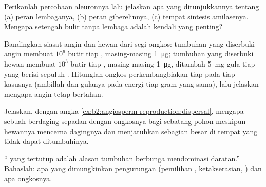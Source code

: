 \begin{exercise}[$\star\star$]\label{exo:b2:angiosperm-reproduction:9}
Perikanlah percobaan aleuronnya lalu jelaskan apa yang ditunjukkannya
tentang (a) peran lembaganya, (b) peran giberelinnya, (c) tempat
sintesis amilasenya. Mengapa setengah bulir tanpa lembaga adalah
kendali yang penting?
\end{exercise}

\begin{exercise}[$\star\star\star$]\label{exo:b2:angiosperm-reproduction:10}
Bandingkan siasat angin dan hewan dari segi ongkos: tumbuhan yang
diserbuki angin membuat $10^{6}$ butir tiap , masing-masing
\qty{1}{\micro g}; tumbuhan yang diserbuki hewan membuat $10^{3}$ butir
tiap , masing-masing \qty{1}{\micro g}, ditambah \qty{5}{mg}
gula  tiap  yang berisi sepuluh . Hitunglah ongkos
perkembangbiakan tiap  pada tiap kasusnya (ambillah  dan gulanya pada energi tiap gram yang sama), lalu jelaskan
mengapa  angin tetap bertahan.
\end{exercise}

\begin{exercise}[$\star\star\star$]\label{exo:b2:angiosperm-reproduction:11}
Jelaskan, dengan angka \cref{ex:b2:angiosperm-reproduction:dispersal},
mengapa sebuah  berdaging sepadan dengan ongkosnya bagi sebatang
pohon meskipun hewannya mencerna dagingnya dan menjatuhkan sebagian
besar  di tempat yang tidak dapat ditumbuhinya.
\end{exercise}

\begin{exercise}[$\star\star\star$]\label{exo:b2:angiosperm-reproduction:12}
`` yang tertutup adalah alasan tumbuhan berbunga mendominasi
daratan.'' Bahaslah: apa yang dimungkinkan pengurungan 
(pemilihan , ketakserasian, ) dan apa ongkosnya.
\end{exercise}

